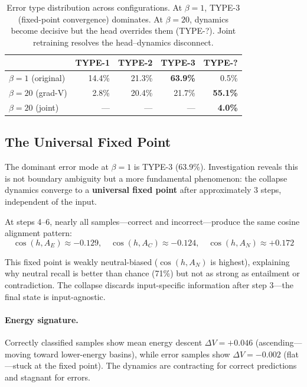 \documentclass[11pt]{article}
\newcommand{\anchor}[1]{A_{#1}}
\begin{document}
\begin{table}[ht]
\centering
\begin{tabular}{@{}lrrrr@{}}
\toprule
& TYPE-1 & TYPE-2 & TYPE-3 & TYPE-? \\
\midrule
$\beta=1$ (original) & 14.4\% & 21.3\% & \textbf{63.9\%} & 0.5\% \\
$\beta=20$ (grad-V) & 2.8\% & 20.4\% & 21.7\% & \textbf{55.1\%} \\
$\beta=20$ (joint) & --- & --- & --- & \textbf{4.0\%} \\
\bottomrule
\end{tabular}
\caption{Error type distribution across configurations. At $\beta=1$,
TYPE-3 (fixed-point convergence) dominates. At $\beta=20$, dynamics
become decisive but the head overrides them (TYPE-?). Joint retraining
resolves the head--dynamics disconnect.}
\label{tab:tunnel}
\end{table}

\subsection{The Universal Fixed Point}
\label{sec:fixedpoint}

The dominant error mode at $\beta=1$ is TYPE-3 (63.9\%). Investigation
reveals this is not boundary ambiguity but a more fundamental phenomenon:
the collapse dynamics converge to a \textbf{universal fixed point} after
approximately 3 steps, independent of the input.

At steps 4--6, nearly all samples---correct and incorrect---produce
the same cosine alignment pattern:
\[
    \cos(h, \anchor{E}) \approx -0.129, \quad
    \cos(h, \anchor{C}) \approx -0.124, \quad
    \cos(h, \anchor{N}) \approx +0.172
\]

This fixed point is weakly neutral-biased ($\cos(h, \anchor{N})$ is
highest), explaining why neutral recall is better than chance (71\%)
but not as strong as entailment or contradiction. The collapse discards
input-specific information after step 3---the final state is
input-agnostic.

\paragraph{Energy signature.}
Correctly classified samples show mean energy descent $\Delta V = +0.046$
(ascending---moving toward lower-energy basins), while error samples
show $\Delta V = -0.002$ (flat---stuck at the fixed point).
The dynamics are contracting for correct predictions and stagnant
for errors.
\end{document}
